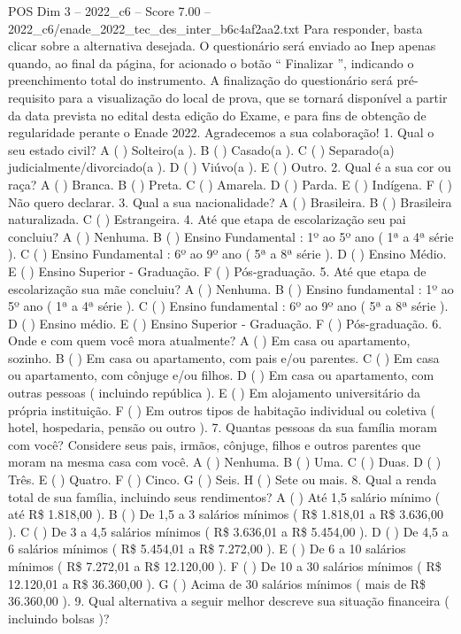 \begin{textsample}{POS Dim 3 – 2022\_c6 – Score 7.00 – 2022\_c6/enade\_2022\_tec\_des\_inter\_b6c4af2aa2.txt}
Para responder, basta clicar sobre a alternativa desejada.
O questionário será enviado ao Inep apenas quando, ao final da página, for acionado o botão “ Finalizar ”, indicando o preenchimento total do instrumento.
A finalização do questionário será pré-requisito para a visualização do local de prova, que se tornará disponível a partir da data prevista no edital desta edição do Exame, e para fins de obtenção de regularidade perante o Enade 2022.
Agradecemos a sua colaboração! 1.
Qual o seu estado civil?
A ( ) Solteiro(a ).
B ( ) Casado(a ).
C ( ) Separado(a) judicialmente/divorciado(a ).
D ( ) Viúvo(a ).
E ( ) Outro. 2.
Qual é a sua cor ou raça?
A ( ) Branca.
B ( ) Preta.
C ( ) Amarela.
D ( ) Parda.
E ( ) Indígena.
F ( ) Não quero declarar. 3.
Qual a sua nacionalidade?
A ( ) Brasileira.
B ( ) Brasileira naturalizada.
C ( ) Estrangeira. 4.
Até que etapa de escolarização seu pai concluiu?
A ( ) Nenhuma.
B ( ) Ensino Fundamental : 1º ao 5º ano ( 1ª a 4ª série ).
C ( ) Ensino Fundamental : 6º ao 9º ano ( 5ª a 8ª série ).
D ( ) Ensino Médio.
E ( ) Ensino Superior - Graduação.
F ( ) Pós-graduação. 5.
Até que etapa de escolarização sua mãe concluiu?
A ( ) Nenhuma.
B ( ) Ensino fundamental : 1º ao 5º ano ( 1ª a 4ª série ).
C ( ) Ensino fundamental : 6º ao 9º ano ( 5ª a 8ª série ).
D ( ) Ensino médio.
E ( ) Ensino Superior - Graduação.
F ( ) Pós-graduação. 6.
Onde e com quem você mora atualmente?
A ( ) Em casa ou apartamento, sozinho.
B ( ) Em casa ou apartamento, com pais e/ou parentes.
C ( ) Em casa ou apartamento, com cônjuge e/ou filhos.
D ( ) Em casa ou apartamento, com outras pessoas ( incluindo república ).
E ( ) Em alojamento universitário da própria instituição.
F ( ) Em outros tipos de habitação individual ou coletiva ( hotel, hospedaria, pensão ou outro ). 7.
Quantas pessoas da sua família moram com você?
Considere seus pais, irmãos, cônjuge, filhos e outros parentes que moram na mesma casa com você.
A ( ) Nenhuma.
B ( ) Uma.
C ( ) Duas.
D ( ) Três.
E ( ) Quatro.
F ( ) Cinco.
G ( ) Seis.
H ( ) Sete ou mais. 8.
Qual a renda total de sua família, incluindo seus rendimentos?
A ( ) Até 1,5 salário mínimo ( até R\$ 1.818,00 ).
B ( ) De 1,5 a 3 salários mínimos ( R\$ 1.818,01 a R\$ 3.636,00 ).
C ( ) De 3 a 4,5 salários mínimos ( R\$ 3.636,01 a R\$ 5.454,00 ).
D ( ) De 4,5 a 6 salários mínimos ( R\$ 5.454,01 a R\$ 7.272,00 ).
E ( ) De 6 a 10 salários mínimos ( R\$ 7.272,01 a R\$ 12.120,00 ).
F ( ) De 10 a 30 salários mínimos ( R\$ 12.120,01 a R\$ 36.360,00 ).
G ( ) Acima de 30 salários mínimos ( mais de R\$ 36.360,00 ). 9.
Qual alternativa a seguir melhor descreve sua situação financeira ( incluindo bolsas )?

\end{textsample}
